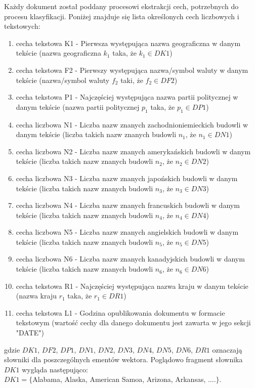 \documentclass{classrep}
\begin{document}
Każdy dokument został poddany procesowi ekstrakcji cech, potrzebnych do procesu klasyfikacji.
Poniżej znajduje się lista określonych cech liczbowych i tekstowych:
\begin{enumerate}
\item cecha tekstowa K1 - Pierwsza występująca nazwa geograficzna w danym tekście (nazwa geograficzna $k_1$ taka, że $k_1 \in DK1$)
\item cecha tekstowa F2 - Pierwszy występująca nazwa/symbol waluty w danym tekście (nazwa/symbol waluty $f_2$ taki, że $f_2 \in DF2$)
\item cecha tekstowa P1 - Najczęściej występująca nazwa partii politycznej w danym tekście (nazwa partii politycznej $p_1$ taka, że $p_1 \in DP1$)
\item cecha liczbowa N1 - Liczba nazw znanych zachodnioniemieckich budowli w danym tekście (liczba takich nazw znanych budowli $n_1$, że $n_1 \in DN1$)
\item cecha liczbowa N2 - Liczba nazw znanych amerykańskich budowli w danym tekście (liczba takich nazw znanych budowli $n_2$, że $n_2 \in DN2$)
\item cecha liczbowa N3 - Liczba nazw znanych japońskich budowli w danym tekście (liczba takich nazw znanych budowli $n_3$, że $n_3 \in DN3$)
\item cecha liczbowa N4 - Liczba nazw znanych francuskich budowli w danym tekście (liczba takich nazw znanych budowli $n_4$, że $n_4 \in DN4$)
\item cecha liczbowa N5 - Liczba nazw znanych angielskich budowli w danym tekście (liczba takich nazw znanych budowli $n_5$, że $n_5 \in DN5$)
\item cecha liczbowa N6 - Liczba nazw znanych kanadyjskich budowli w danym tekście (liczba takich nazw znanych budowli $n_6$, że $n_6 \in DN6$)
\item cecha tekstowa R1 - Najczęściej występująca nazwa kraju w danym tekście (nazwa kraju $r_1$ taka, że $r_1 \in DR1$)
\item cecha tekstowa L1 - Godzina opublikowania dokumentu w formacie tekstowym (wartość cechy dla danego dokumentu jest zawarta w jego sekcji "DATE")\\
\end{enumerate}
gdzie $DK1$, $DF2$, $DP1$, $DN1$, $DN2$, $DN3$, $DN4$, $DN5$, $DN6$, $DR1$ oznaczają słowniki dla poszczególnych ementów wektora. Poglądowo fragment słownika $DK1$ wygląda następująco:\\
 $DK1 = \{$Alabama, Alaska, American Samoa, Arizona, Arkansas, ....$\} $. \\
\end{document}
